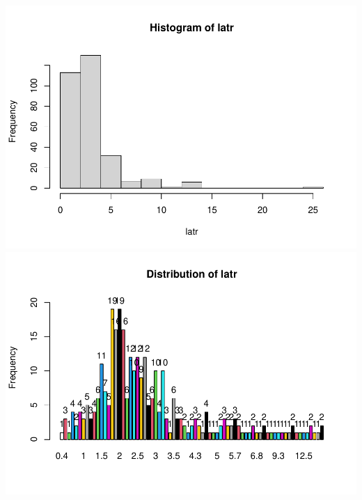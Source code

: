 \documentclass[
  english,
  ,jou]{apa6}
\begin{document}
\includegraphics{KuncelTellegen2_files/figure-latex/getQualtrics-2.pdf} \includegraphics{KuncelTellegen2_files/figure-latex/getQualtrics-3.pdf}
\end{document}

